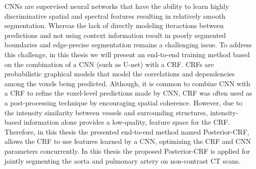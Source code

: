  CNNs are supervised neural networks that have the ability to learn highly discriminative spatial and spectral features resulting in relatively smooth segmentation. Whereas the lack of directly modeling iteractions between predictions and not using context information result in poorly segmented boundaries and edge-precise segmentation remains a challenging issue. To address this challenge, in this thesis we will present an end-to-end training method based on the combination of a \gls{CNN} (such as U-net) with a \gls{CRF}. CRFs are probabilistic graphical models that model the correlations and dependencies among the voxels being predicted. Although, it is common to combine \gls{CNN} with a \gls{CRF} to refine the voxel-level predictions made by \gls{CNN}, \gls{CRF} was often used as a post-processing technique by encouraging spatial coherence. However, due to the intensity similarity between vessels and surrounding structures, intensity-based information alone provides a low-quality, feature space for the CRF. Therefore, in this thesis the presented end-to-end method named Posterior-CRF, allows the CRF to use features learned by a \gls{CNN}, optimizing the \gls{CRF} and \gls{CNN} parameters concurrently. In this thesis the proposed Posterior-CRF is applied for jointly segmenting the aorta and pulmonary artery on non-contrast \gls{CT} scans.




